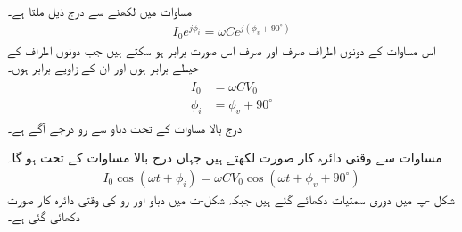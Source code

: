 مساوات  میں  لکھنے سے درج ذیل ملتا ہے۔
\begin{align}\label{مساوات_بدلتا_برق_گیر_دوری_مساوات_ب}
I_0 e^{j\phi_i}= \omega C e^{j (\phi_v+90^{\circ})}
\end{align}
اس مساوات کے دونوں اطراف صرف اور صرف اس صورت برابر ہو سکتے ہیں جب دونوں اطراف کے حیطے برابر ہوں اور ان کے زاویے برابر ہوں۔
\begin{gather}
\begin{aligned}
I_0&=\omega C V_0\\
\phi_i&=\phi_v+90^{\circ}
\end{aligned}
\end{gather}
درج بالا مساوات کے تحت دباو سے رو  درجے آگے ہے۔

مساوات  سے وقتی دائرہ کار صورت لکھتے ہیں جہاں درج بالا مساوات کے تحت  ہو گا۔
\begin{align}
I_0 \cos (\omega t +\phi_i)=\omega C V_0 \cos(\omega t +\phi_v+90^{\circ})
\end{align}
شکل -پ میں دوری سمتیات دکھائے گئے ہیں جبکہ شکل-ت میں دباو اور رو کی وقتی دائرہ کار صورت دکھائی گئی ہے۔

